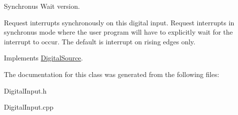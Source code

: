 \-Synchronus \-Wait version. 

\-Request interrupts synchronously on this digital input. \-Request interrupts in synchronus mode where the user program will have to explicitly wait for the interrupt to occur. \-The default is interrupt on rising edges only. 

\-Implements \hyperlink{classDigitalSource_a693e9521e21758c8d5f3d221dc9e9b5b}{\-Digital\-Source}.



\-The documentation for this class was generated from the following files\-:\begin{DoxyCompactItemize}
\item 
\-Digital\-Input.\-h\item 
\-Digital\-Input.\-cpp\end{DoxyCompactItemize}
